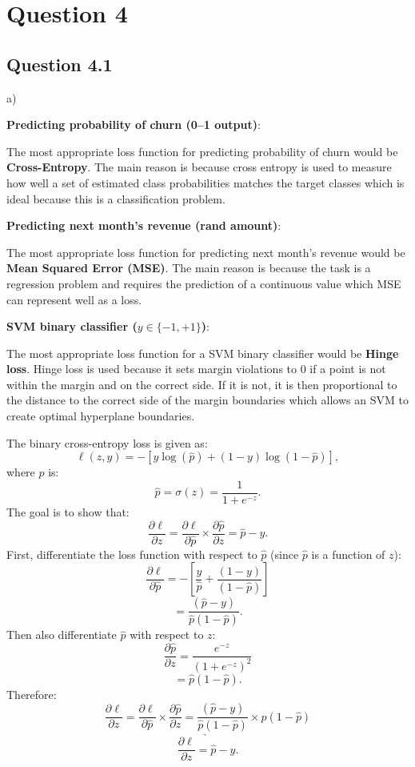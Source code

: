 \section{Question 4}

\subsection{Question 4.1}

\begin{partquestion2}{a)}

\textbf{Predicting probability of churn (0–1 output)}:

The most appropriate loss function for predicting probability of churn would be \textbf{Cross-Entropy}.
The main reason is because cross entropy is used to measure how well a set of estimated
class probabilities matches the target classes which is ideal because this is a classification problem.

\textbf{Predicting next month’s revenue (rand amount)}:

The most appropriate loss function for predicting next month's revenue would be \textbf{Mean Squared Error (MSE)}.
The main reason is because the task is a regression problem and requires the prediction of a 
continuous value which MSE can represent well as a loss.

\textbf{SVM binary classifier ($y \in \{-1, +1\}$)}:

The most appropriate loss function for a SVM binary classifier would be \textbf{Hinge loss}. Hinge loss is used
because it sets margin violations to 0 if a point is not within the margin and on the correct side. If it is not,
it is then proportional to the distance to the correct side of the margin boundaries which allows an SVM to 
create optimal hyperplane boundaries.
\end{partquestion2}
\newpage
{} The binary cross-entropy loss is given as:
\[\ell(z,y) = - [y \log(\hat{p}) + (1 - y) \log(1 - \hat{p})],\]
where $\hat{p}$ is:
\[\hat{p} = \sigma(z) = \frac{1}{1+e^{-z}}.\]
The goal is to show that:
\[\frac{\partial \ell}{\partial z} = \frac{\partial \ell}{\partial \hat{p}} \times \frac{\partial \hat{p}}{\partial z} = \hat{p} - y .\]
First, differentiate the loss function with respect to $\hat{p}$ (since $\hat{p}$ is a function of $z$):
\[\frac{\partial \ell}{\partial \hat{p}} = - \left[\frac{y}{\hat{p}} + \frac{(1 - y)}{(1 - \hat{p})}\right] \]
\[= \frac{(\hat{p} - y)}{\hat{p}(1 - \hat{p})}.\]
Then also differentiate $\hat{p}$ with respect to $z$:
\[\frac{\partial \hat{p}}{\partial z} = \frac{e^{-z}}{(1 + e^{-z})^2}\]
\[= \hat{p}({1 - \hat{p}}).\]
Therefore:
\[\frac{\partial \ell}{\partial z} = \frac{\partial \ell}{\partial \hat{p}} \times \frac{\partial \hat{p}}{\partial z} = \frac{(\hat{p} - y)}{\hat{p}(1 - \hat{p})} \times \hat{p}({1 - \hat{p}})\]
\[\underrightarrow{\frac{\partial \ell}{\partial z} = \hat{p} - y}.\]

